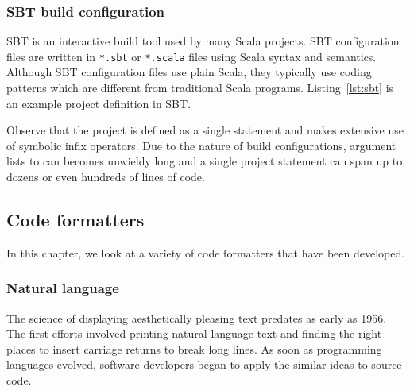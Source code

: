\subsubsection{SBT build configuration}
SBT\autocite{_sbt_????} is an interactive build tool used by many Scala projects.
SBT configuration files are written in \texttt{*.sbt} or \texttt{*.scala} files using Scala syntax and semantics.
Although SBT configuration files use plain Scala, they typically use coding patterns which are different from traditional Scala programs.
Listing~\ref{lst:sbt} is an example project definition in SBT.

Observe that the project is defined as a single statement and makes extensive use of symbolic infix operators.
Due to the nature of build configurations, argument lists to can becomes unwieldy long and a single project statement can span up to dozens or even hundreds of lines of code.


\subsection{Code formatters}
%

In this chapter, we look at a variety of code formatters that have been developed.

\subsubsection{Natural language}
The science of displaying aesthetically pleasing text predates as early as 1956\autocite{harris_keyboard_1956}.
The first efforts involved printing natural language text and finding the right places to insert carriage returns to break long lines.
As soon as programming languages evolved, software developers began to apply the similar ideas to source code.

